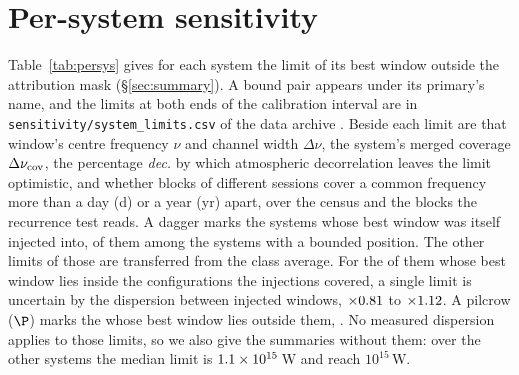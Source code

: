 \section{Per-system sensitivity}
\label{app:persys}

Table~\ref{tab:persys} gives for each system the limit of its best window
outside the attribution mask (\S\ref{sec:summary}). A bound pair appears
under its primary's name, and the limits at both ends of the calibration
interval are in \texttt{sensitivity/\allowbreak system\_limits.csv} of the
data archive \citep{SIdeposit}. Beside each limit are that window's centre
frequency $\nu$ and channel width $\Delta\nu$, the system's merged coverage
$\Delta\nu_{\rm cov}$, the percentage \emph{dec.} by which atmospheric
decorrelation leaves the limit optimistic, and whether blocks of different
sessions cover a common frequency more than a day (d) or a year (yr) apart,
over the census and the \ZcNRecEB{} blocks the recurrence test reads. A
dagger marks the \SmcNMeasSys{} systems whose best window was itself injected
into, \SmcNMeasSysBnd{} of them among the \NSysALimSum{} systems with a bounded
position. The other \SmcNEstSysBnd{} limits of those \NSysALimSum{} are transferred
from the class average. For the \NgNInterpEstSysBnd{} of them whose best window
lies inside the configurations the injections covered, a single limit is
uncertain by the dispersion between injected windows, $\times0.81$ to
$\times1.12$. A pilcrow ($\P$) marks the \NgNExtrapSys{}
\NgExtrapSysNoun{} whose best window lies outside them, \NgExtrapSys. No
measured dispersion applies to those limits, so we also give the summaries
without them: over the other \NgNSysInterpSum{} systems the median limit is
$1.1\times10^{15}$\,W and \NgNSysEfifteenInterp{} reach $10^{15}$\,W.

